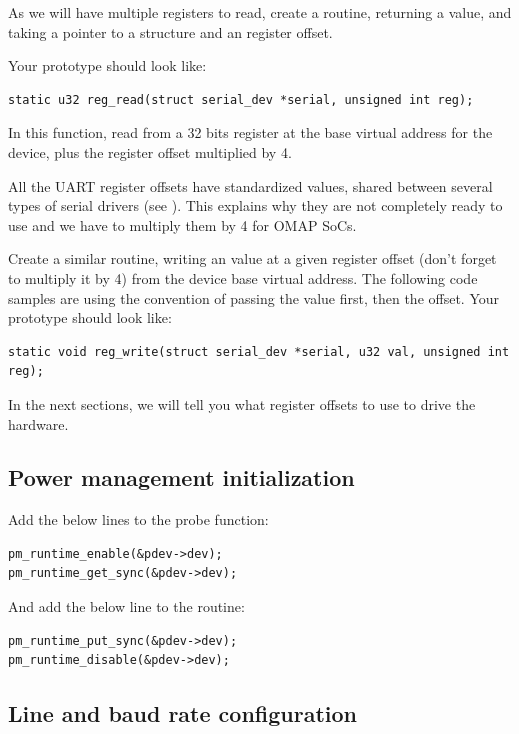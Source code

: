 As we will have multiple registers to read, create a 
routine, returning a  value, and taking a 
pointer to a  structure and an 
register offset.

Your prototype should look like:
\begin{verbatim}
static u32 reg_read(struct serial_dev *serial, unsigned int reg);
\end{verbatim}

In this function, read from a 32 bits register at the base virtual
address for the device, plus the register offset multiplied by 4.

All the UART register offsets have standardized values, shared between
several types of serial drivers (see
). This explains why they are not
completely ready to use and we have to multiply them by 4 for OMAP SoCs.

Create a similar  routine, writing an 
value at a given register offset (don't forget to multiply it by 4) from
the device base virtual address. The following code samples are using
the  convention of passing the value first, then the
offset. Your prototype should look like:
\begin{verbatim}
static void reg_write(struct serial_dev *serial, u32 val, unsigned int reg);
\end{verbatim}

In the next sections, we will tell you what register offsets to use
to drive the hardware.

\subsection{Power management initialization}

Add the below lines to the probe function:

\begin{verbatim}
pm_runtime_enable(&pdev->dev);
pm_runtime_get_sync(&pdev->dev);
\end{verbatim}

And add the below line to the  routine:

\begin{verbatim}
pm_runtime_put_sync(&pdev->dev);
pm_runtime_disable(&pdev->dev);
\end{verbatim}

\subsection{Line and baud rate configuration}

